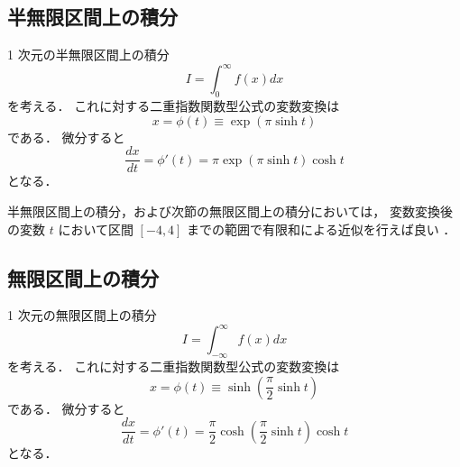 \subsection{半無限区間上の積分}

1 次元の半無限区間上の積分
\begin{equation}
    I = \int_{0}^{\infty} f(x) dx
\end{equation}
を考える．
これに対する二重指数関数型公式の変数変換は
\begin{equation}
    x = \phi(t) \equiv \exp(\pi \sinh{t})
\end{equation}
である\cite[Section 4.5.3]{Press2007}．
微分すると
\begin{equation}
    \frac{dx}{dt} = \phi'(t)
    = \pi \exp(\pi \sinh{t}) \cosh{t}
\end{equation}
となる．

半無限区間上の積分，および次節の無限区間上の積分においては，
変数変換後の変数 $t$ において区間 $[-4, 4]$ までの範囲で有限和による近似を行えば良い
\cite[4.5.3]{Press2007}．

\subsection{無限区間上の積分}

1 次元の無限区間上の積分
\begin{equation}
    I = \int_{-\infty}^{\infty} f(x) dx
\end{equation}
を考える．
これに対する二重指数関数型公式の変数変換は
\begin{equation}
    x = \phi(t) \equiv \sinh \left(\frac{\pi}{2} \sinh{t}\right)
\end{equation}
である\cite[Section 4.5.3]{Press2007}．
微分すると
\begin{equation}
    \frac{dx}{dt} = \phi'(t)
    = \frac{\pi}{2} \cosh \left(\frac{\pi}{2} \sinh{t}\right) \cosh{t}
\end{equation}
となる．
